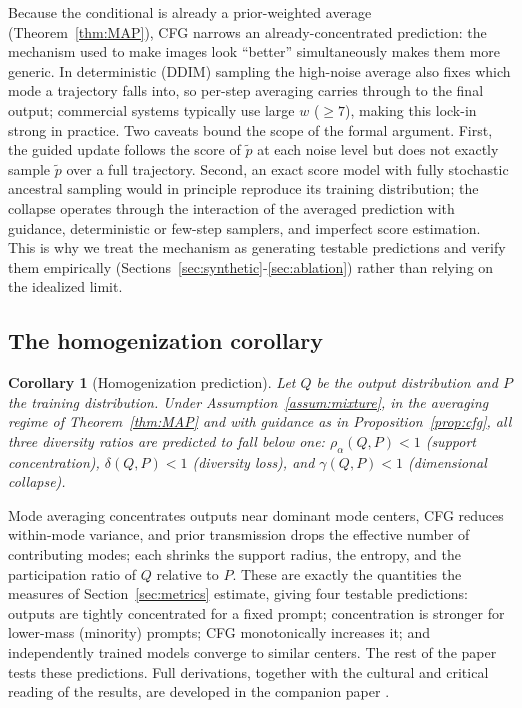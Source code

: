 \documentclass[11pt]{article}
\newtheorem{corollary}{Corollary}
\begin{document}
Because the conditional is already a prior-weighted average (Theorem~\ref{thm:MAP}), CFG narrows an already-concentrated prediction: the mechanism used to make images look ``better'' simultaneously makes them more generic. In deterministic (DDIM) sampling the high-noise average also fixes which mode a trajectory falls into, so per-step averaging carries through to the final output; commercial systems typically use large $w$ ($\ge 7$), making this lock-in strong in practice. Two caveats bound the scope of the formal argument. First, the guided update follows the score of $\tilde{p}$ at each noise level but does not exactly sample $\tilde{p}$ over a full trajectory. Second, an exact score model with fully stochastic ancestral sampling would in principle reproduce its training distribution; the collapse operates through the interaction of the averaged prediction with guidance, deterministic or few-step samplers, and imperfect score estimation. This is why we treat the mechanism as generating testable predictions and verify them empirically (Sections~\ref{sec:synthetic}-\ref{sec:ablation}) rather than relying on the idealized limit.

\subsection{The homogenization corollary}

\begin{corollary}[Homogenization prediction]\label{cor:homogen}
Let $Q$ be the output distribution and $P$ the training distribution. Under Assumption~\ref{assum:mixture}, in the averaging regime of Theorem~\ref{thm:MAP} and with guidance as in Proposition~\ref{prop:cfg}, all three diversity ratios are predicted to fall below one: $\rho_\alpha(Q,P)<1$ (support concentration), $\delta(Q,P)<1$ (diversity loss), and $\gamma(Q,P)<1$ (dimensional collapse).
\end{corollary}

Mode averaging concentrates outputs near dominant mode centers, CFG reduces within-mode variance, and prior transmission drops the effective number of contributing modes; each shrinks the support radius, the entropy, and the participation ratio of $Q$ relative to $P$. These are exactly the quantities the measures of Section~\ref{sec:metrics} estimate, giving four testable predictions: outputs are tightly concentrated for a fixed prompt; concentration is stronger for lower-mass (minority) prompts; CFG monotonically increases it; and independently trained models converge to similar centers. The rest of the paper tests these predictions. Full derivations, together with the cultural and critical reading of the results, are developed in the companion paper \citep{Companion2026}.
\end{document}
